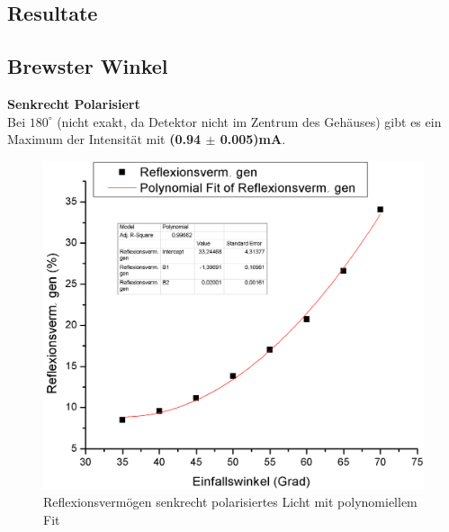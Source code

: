 \documentclass[12pt,a4paper]{article}
\begin{document}
\begin{multicols}{2}

\section{Resultate}

\subsection{Brewster Winkel}
\textbf{Senkrecht Polarisiert}\\
Bei $180^\circ$ (nicht exakt, da Detektor nicht im Zentrum des Gehäuses) gibt es ein Maximum der Intensität mit \textbf{(0.94 $\pm$ 0.005)mA}.\\

\begin{figure}[H]
	\centering
	\includegraphics[scale=0.28]{./data/R_S_Plot.png}
	\caption{Reflexionsvermögen senkrecht polarisiertes Licht mit polynomiellem Fit}
	\label{fig:r_s_plot}
\end{figure}


\end{multicols}
\end{document}

